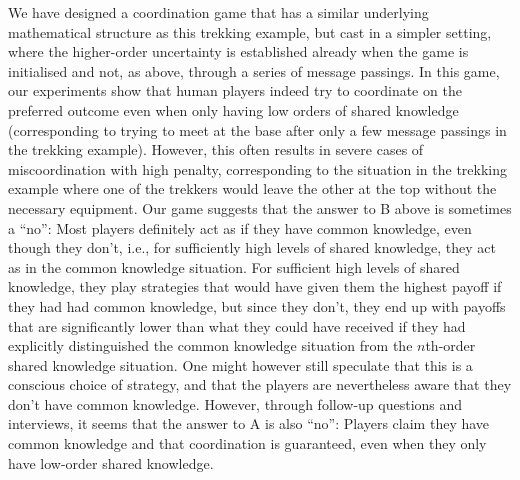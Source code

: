 \documentclass[twocolumn,a4paper,superscriptaddress,nofootinbib]{revtex4}
\newcommand{\tsn}[1]{{\color{blue} TSN: #1}}
\begin{document}
We have designed a coordination game that has a similar underlying mathematical structure as this trekking example, but cast in a simpler setting, where the higher-order uncertainty is established already when the game is initialised and not, as above, through a series of message passings. In this game, our experiments show that human players indeed try to coordinate on the preferred outcome even when only having low orders of shared knowledge (corresponding to trying to meet at the base after only a few message passings in the trekking example). However, this often results in severe cases of miscoordination with high penalty, corresponding to the situation in the trekking example where one of the trekkers would leave the other at the top without the necessary equipment. Our game suggests that the answer to B above is sometimes a ``no'': Most players definitely act as if they have common knowledge, even though they don't, i.e., for sufficiently high levels of shared knowledge, they act as in the common knowledge situation. For sufficient high levels of shared knowledge, they play strategies that would have given them the highest payoff if they had had common knowledge, but since they don't, they end up with payoffs that are significantly lower than what they could have received if they had explicitly distinguished the common knowledge situation from the $n$th-order shared knowledge situation. One might however still speculate that this is a 
conscious choice of strategy, and that the players are nevertheless aware that they don't have common knowledge. However, through follow-up questions and interviews, it seems that the answer to A is also ``no'': Players claim they have common knowledge and that coordination is guaranteed, even when they only have low-order shared knowledge.     
\end{document}
